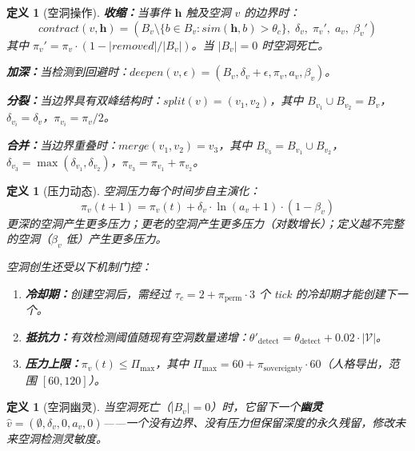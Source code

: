\documentclass[11pt]{article}
\newtheorem{definition}[theorem]{定义}
\begin{document}
\begin{definition}[空洞操作]
\label{def:void-ops}
\textbf{收缩：}当事件 $\mathbf{h}$ 触及空洞 $v$ 的边界时：
\begin{equation}
contract(v, \mathbf{h}) = (B_v \setminus \{b \in B_v : sim(\mathbf{h}, b) > \theta_c\},\; \delta_v,\; \pi_v',\; a_v,\; \beta_v')
\end{equation}
其中 $\pi_v' = \pi_v \cdot (1 - |removed|/|B_v|)$。当 $|B_v| = 0$ 时空洞死亡。

\textbf{加深：}当检测到回避时：$deepen(v, \epsilon) = (B_v, \delta_v + \epsilon, \pi_v, a_v, \beta_v)$。

\textbf{分裂：}当边界具有双峰结构时：$split(v) = (v_1, v_2)$，其中 $B_{v_1} \cup B_{v_2} = B_v$，$\delta_{v_i} = \delta_v$，$\pi_{v_i} = \pi_v/2$。

\textbf{合并：}当边界重叠时：$merge(v_1, v_2) = v_3$，其中 $B_{v_3} = B_{v_1} \cup B_{v_2}$，$\delta_{v_3} = \max(\delta_{v_1}, \delta_{v_2})$，$\pi_{v_3} = \pi_{v_1} + \pi_{v_2}$。
\end{definition}

\begin{definition}[压力动态]
\label{def:pressure}
空洞压力每个时间步自主演化：
\begin{equation}
\pi_v(t+1) = \pi_v(t) + \delta_v \cdot \ln(a_v + 1) \cdot (1 - \beta_v)
\label{eq:pressure}
\end{equation}
更深的空洞产生更多压力；更老的空洞产生更多压力（对数增长）；定义越不完整的空洞（$\beta_v$ 低）产生更多压力。

空洞创生还受以下机制门控：
\begin{enumerate}
\item \textbf{冷却期：}创建空洞后，需经过 $\tau_c = 2 + \pi_{\text{perm}} \cdot 3$ 个 tick 的冷却期才能创建下一个。
\item \textbf{抵抗力：}有效检测阈值随现有空洞数量递增：$\theta'_{\text{detect}} = \theta_{\text{detect}} + 0.02 \cdot |\mathcal{V}|$。
\item \textbf{压力上限：}$\pi_v(t) \leq \Pi_{\max}$，其中 $\Pi_{\max} = 60 + \pi_{\text{sovereignty}} \cdot 60$（人格导出，范围 $[60, 120]$）。
\end{enumerate}
\end{definition}

\begin{definition}[空洞幽灵]
\label{def:ghost}
当空洞死亡（$|B_v| = 0$）时，它留下一个\textbf{幽灵} $\hat{v} = (\emptyset, \delta_v, 0, a_v, 0)$——一个没有边界、没有压力但保留深度的永久残留，修改未来空洞检测灵敏度。
\end{definition}
\end{document}

